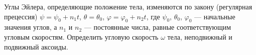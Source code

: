 Углы Эйлера, определяющие положение тела, изменяются по закону
(регулярная прецессия) $\psi = \psi _0 + n_1t$, $\theta = \theta _0$,
$\varphi = \varphi _0 + n_2t$, где $\psi _0$, $\theta _0$, $\varphi _0$ ---
начальные значения углов, а $n_1$ и $n_2$ --- постоянные числа,
равные соответствующим угловым скоростям.
Определить угловую скорость $\omega$ тела, неподвижный и подвижный аксоиды.
